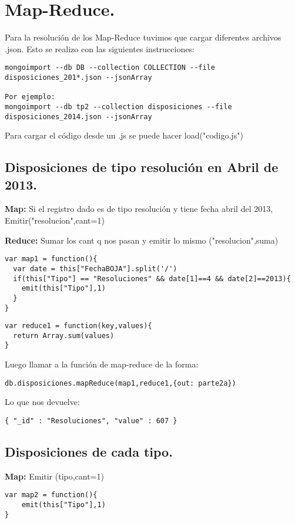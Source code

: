 \section{Map-Reduce.}
Para la resolución de los Map-Reduce tuvimos que cargar diferentes archivos .json. Esto se realizo con las siguientes instrucciones:
\begin{lstlisting}
mongoimport --db DB --collection COLLECTION --file 
disposiciones_201*.json --jsonArray

Por ejemplo:
mongoimport --db tp2 --collection disposiciones --file 
disposiciones_2014.json --jsonArray
\end{lstlisting}

Para cargar el código desde un .js se puede hacer load("codigo.js")

\subsection{Disposiciones de tipo resolución en Abril de 2013.}
\textbf{Map:}
Si el registro dado es de tipo resolución y tiene fecha abril del 2013, Emitir("resolucion",cant=1)

\textbf{Reduce:}
Sumar los cant q nos pasan y emitir lo mismo ("resolucion",suma)

\begin{lstlisting}
var map1 = function(){
  var date = this["FechaBOJA"].split('/')
  if(this["Tipo"] == "Resoluciones" && date[1]==4 && date[2]==2013){
    emit(this["Tipo"],1)
  }
}
\end{lstlisting}

\begin{lstlisting}
var reduce1 = function(key,values){
  return Array.sum(values)
}
\end{lstlisting}

Luego llamar a la función de map-reduce de la forma:
\begin{lstlisting}
db.disposiciones.mapReduce(map1,reduce1,{out: parte2a})
\end{lstlisting}

Lo que nos devuelve:

\begin{lstlisting}
{ "_id" : "Resoluciones", "value" : 607 }
\end{lstlisting}

\subsection{Disposiciones de cada tipo.}
\textbf{Map:}
Emitir (tipo,cant=1)
\begin{lstlisting}
var map2 = function(){
	emit(this["Tipo"],1)
}

\end{lstlisting}

